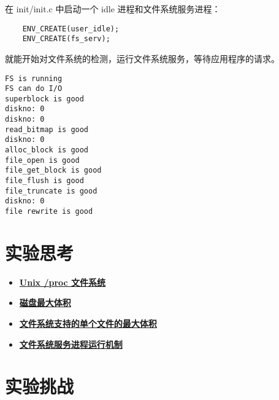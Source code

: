 在 init/init.c 中启动一个 idle 进程和文件系统服务进程：

\begin{verbatim}
    ENV_CREATE(user_idle);
    ENV_CREATE(fs_serv);
\end{verbatim}

就能开始对文件系统的检测，运行文件系统服务，等待应用程序的请求。

\begin{verbatim}
FS is running
FS can do I/O
superblock is good
diskno: 0
diskno: 0
read_bitmap is good
diskno: 0
alloc_block is good
file_open is good
file_get_block is good
file_flush is good
file_truncate is good
diskno: 0
file rewrite is good
\end{verbatim}

\section{实验思考}

\begin{itemize}
\item \hyperref[think-proc]{\textbf{\textcolor{baseB}{Unix /proc 文件系统}}}
\item \hyperref[think-disksize]{\textbf{\textcolor{baseB}{磁盘最大体积}}}
\item \hyperref[think-filesize]{\textbf{\textcolor{baseB}{文件系统支持的单个文件的最大体积}}}
\item \hyperref[think-fs-serve]{\textbf{\textcolor{baseB}{文件系统服务进程运行机制}}}
\end{itemize}

\section{实验挑战}




